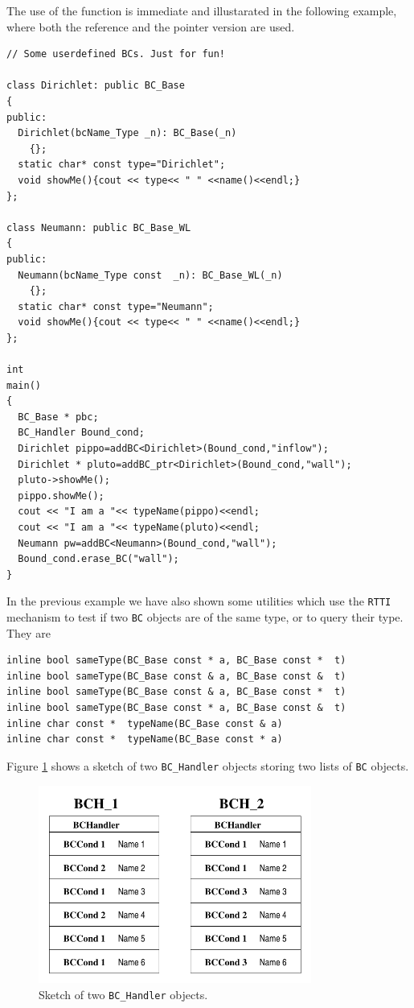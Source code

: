 The use of the function is immediate and illustarated in the following
example, where both the reference and the pointer version are used.
\begin{verbatim}
// Some userdefined BCs. Just for fun!

class Dirichlet: public BC_Base
{
public:
  Dirichlet(bcName_Type _n): BC_Base(_n)
    {};
  static char* const type="Dirichlet";
  void showMe(){cout << type<< " " <<name()<<endl;}
};

class Neumann: public BC_Base_WL
{
public:
  Neumann(bcName_Type const  _n): BC_Base_WL(_n)
    {};
  static char* const type="Neumann";
  void showMe(){cout << type<< " " <<name()<<endl;}
};

int
main()
{
  BC_Base * pbc;
  BC_Handler Bound_cond; 
  Dirichlet pippo=addBC<Dirichlet>(Bound_cond,"inflow");
  Dirichlet * pluto=addBC_ptr<Dirichlet>(Bound_cond,"wall");
  pluto->showMe();
  pippo.showMe();
  cout << "I am a "<< typeName(pippo)<<endl;
  cout << "I am a "<< typeName(pluto)<<endl;
  Neumann pw=addBC<Neumann>(Bound_cond,"wall");
  Bound_cond.erase_BC("wall");
}
\end{verbatim}
In the previous example we have also shown some utilities which
use the \texttt{RTTI} mechanism to test if two \texttt{BC} objects are 
of the same type, or to query their type. They are
\begin{verbatim}
inline bool sameType(BC_Base const * a, BC_Base const *  t)
inline bool sameType(BC_Base const & a, BC_Base const &  t)
inline bool sameType(BC_Base const & a, BC_Base const *  t)
inline bool sameType(BC_Base const * a, BC_Base const &  t)
inline char const *  typeName(BC_Base const & a)
inline char const *  typeName(BC_Base const * a)
\end{verbatim}
Figure \ref{fig:bchandler} shows a sketch of two \texttt{BC\_Handler}
objects storing two lists of \texttt{BC} objects. 
\begin{figure}[ht]
\includegraphics[width=0.8\textwidth]{BCHandler}
\caption{Sketch of two \texttt{BC\_Handler} objects.\label{fig:bchandler}}
\end{figure}


